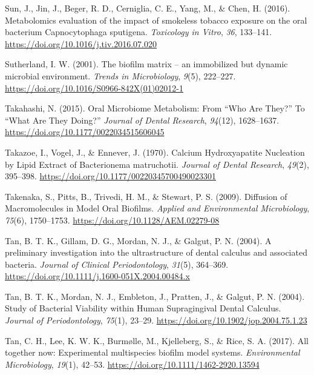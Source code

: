 \documentclass[
  letterpaper,
]{book}
\newlength{\cslhangindent}
\newlength{\cslentryspacingunit} %
\newenvironment{CSLReferences}[2] %
 {%
  \setlength{\parindent}{0pt}
  \ifodd #1
  \let\oldpar\par
  \def\par{\hangindent=\cslhangindent\oldpar}
  \fi
  \setlength{\parskip}{#2\cslentryspacingunit}
 }%
 {}
\begin{document}
\begin{CSLReferences}{1}{0}
\leavevmode{}%
Sun, J., Jin, J., Beger, R. D., Cerniglia, C. E., Yang, M., \& Chen, H.
(2016). Metabolomics evaluation of the impact of smokeless tobacco
exposure on the oral bacterium {Capnocytophaga} sputigena.
\emph{Toxicology in Vitro}, \emph{36}, 133--141.
\url{https://doi.org/10.1016/j.tiv.2016.07.020}

\leavevmode{}%
Sutherland, I. W. (2001). The biofilm matrix -- an immobilized but
dynamic microbial environment. \emph{Trends in Microbiology},
\emph{9}(5), 222--227.
\url{https://doi.org/10.1016/S0966-842X(01)02012-1}

\leavevmode{}%
Takahashi, N. (2015). Oral {Microbiome Metabolism}: {From} {``{Who Are
They}?''} To {``{What Are They Doing}?''} \emph{Journal of Dental
Research}, \emph{94}(12), 1628--1637.
\url{https://doi.org/10.1177/0022034515606045}

\leavevmode{}%
Takazoe, I., Vogel, J., \& Ennever, J. (1970). Calcium {Hydroxyapatite
Nucleation} by {Lipid Extract} of {Bacterionema} matruchotii.
\emph{Journal of Dental Research}, \emph{49}(2), 395--398.
\url{https://doi.org/10.1177/00220345700490023301}

\leavevmode{}%
Takenaka, S., Pitts, B., Trivedi, H. M., \& Stewart, P. S. (2009).
Diffusion of {Macromolecules} in {Model Oral Biofilms}. \emph{Applied
and Environmental Microbiology}, \emph{75}(6), 1750--1753.
\url{https://doi.org/10.1128/AEM.02279-08}

\leavevmode{}%
Tan, B. T. K., Gillam, D. G., Mordan, N. J., \& Galgut, P. N. (2004). A
preliminary investigation into the ultrastructure of dental calculus and
associated bacteria. \emph{Journal of Clinical Periodontology},
\emph{31}(5), 364--369.
\url{https://doi.org/10.1111/j.1600-051X.2004.00484.x}

\leavevmode{}%
Tan, B. T. K., Mordan, N. J., Embleton, J., Pratten, J., \& Galgut, P.
N. (2004). Study of {Bacterial Viability} within {Human Supragingival
Dental Calculus}. \emph{Journal of Periodontology}, \emph{75}(1),
23--29. \url{https://doi.org/10.1902/jop.2004.75.1.23}

\leavevmode{}%
Tan, C. H., Lee, K. W. K., Burmølle, M., Kjelleberg, S., \& Rice, S. A.
(2017). All together now: Experimental multispecies biofilm model
systems. \emph{Environmental Microbiology}, \emph{19}(1), 42--53.
\url{https://doi.org/10.1111/1462-2920.13594}


\end{CSLReferences}
\end{document}
